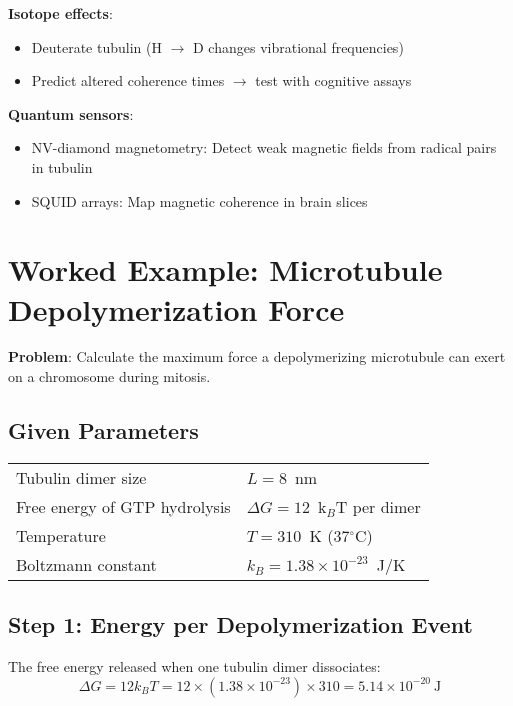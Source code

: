 \textbf{Isotope effects}:
\begin{itemize}
\item Deuterate tubulin (H $\rightarrow$ D changes vibrational frequencies)
\item Predict altered coherence times $\rightarrow$ test with cognitive assays
\end{itemize}

\textbf{Quantum sensors}:
\begin{itemize}
\item NV-diamond magnetometry: Detect weak magnetic fields from radical pairs in tubulin
\item SQUID arrays: Map magnetic coherence in brain slices
\end{itemize}


\section{Worked Example: Microtubule Depolymerization Force}
\label{sec:worked-example}

\textbf{Problem}: Calculate the maximum force a depolymerizing microtubule can exert on a chromosome during mitosis.

\subsection*{Given Parameters}

\begin{tabular}{@{}ll@{}}
Tubulin dimer size & $L = 8$~nm \\
Free energy of GTP hydrolysis & $\Delta G = 12$~k$_B$T per dimer \\
Temperature & $T = 310$~K (37$^\circ$C) \\
Boltzmann constant & $k_B = 1.38 \times 10^{-23}$~J/K \\
\end{tabular}

\subsection*{Step 1: Energy per Depolymerization Event}

The free energy released when one tubulin dimer dissociates:
\begin{equation}
\Delta G = 12 k_B T = 12 \times (1.38 \times 10^{-23}) \times 310 = 5.14 \times 10^{-20}~\text{J}
\label{eq:delta-g}
\end{equation}

